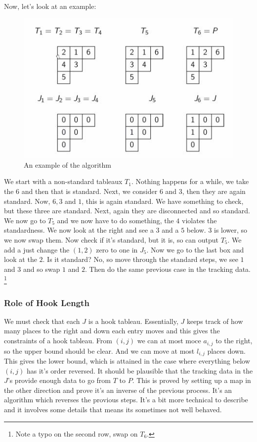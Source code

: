 \documentclass{article}
\begin{document}
Now, let's look at an example:
\begin{figure}[!ht]
  \centering
  \includegraphics{./figures/L3.5}
  \caption{An example of the algorithm}
\end{figure}

We start with a non-standard tableaux $T_1$. Nothing happens for a while, we take the $6$ and then that is standard. Next, we consider $6$ and $3$, then they are again standard. Now, $6, 3$ and $1$, this is again standard. We have something to check, but these three are standard. Next, again they are disconnected and so standard. We now go to $T_5$ and we now have to do something, the $4$ violates the standardness. We now look at the right and see a $3$ and a $5$ below. $3$ is lower, so we now swap them. Now check if it's standard, but it is, so can output $T_5$. We add a just change the $(1, 2)$ zero to one in $J_5$. Now we go to the last box and look at the $2$. Is it standard? No, so move through the standard steps, we see $1$ and $3$ and so swap $1$ and $2$. Then do the same previous case in the tracking data. \footnote{ Note a typo on the second row, swap on $T_6$.}

\subsubsection{Role of Hook Length}
We must check that each $J$ is a hook tableau. Essentially, $J$ keeps track of how many places to the right and down each entry moves and this gives the constraints of a hook tableau.
From $(i, j)$ we can at most moce $a_{i,j}$ to the right, so the upper bound should be clear. And we can move at most $l_{i,j}$ places down. This gives the lower bound, which is attained in the case where everything below $(i, j)$ has it's order reversed. It should be plausible that the tracking data in the $J$'s provide enough data to go from $T$ to $P$. This is proved by setting up a map in the other direction and prove it's an inverse of the previous process. It's an algorithm which reverses the provious steps. It's a bit more technical to describe and it involves some details that means its sometimes not well behaved.
\end{document}
